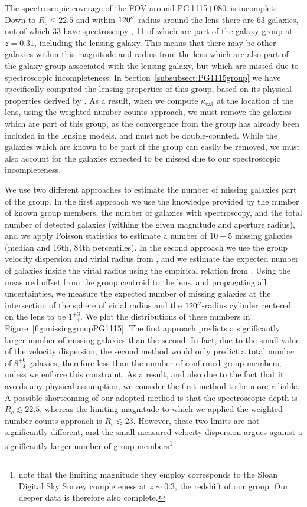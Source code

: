 \documentclass[useAMS,usenatbib]{mnras}
\newcommand\pg{PG\,1115$+$080}
\begin{document}
The spectroscopic coverage of the FOV around \pg~is incomplete. Down to $R_c\leq22.5$ and within $120\hbox{$^{\prime\prime}$}$-radius around the lens there are 63 galaxies, out of which 33 have spectroscopy \citep{WilsonEtal16}, 11 of which are part of the galaxy group at $z=0.31$, including the lensing galaxy. This means that there may be other galaxies within this magnitude and radius from the lens which are also part of the galaxy group associated with the lensing galaxy, but which are missed due to spectroscopic incompleteness. In Section~\ref{subsubsect:PG1115group} we have specifically computed the lensing properties of this group, based on its physical properties derived by \citet{WilsonEtal16}. As a result, when we compute $\kappa_\mathrm{ext}$ at the location of the lens, using the weighted number counts approach, we must remove the galaxies which are part of this group, as the convergence from the group has already been included in the lensing models, and must not be double-counted. While the galaxies which are known to be part of the group can easily be removed, we must also account for the galaxies expected to be missed due to our spectroscopic incompleteness. 

We use two different approaches to estimate the number of missing galaxies part of the group. In the first approach we use the knowledge provided by the number of known group members, the number of galaxies with spectroscopy, and the total number of detected galaxies (withing the given magnitude and aperture radius), and we apply Poisson statistics to estimate a number of $10\pm5$ missing galaxies (median and 16th, 84th percentiles). In the second approach we use the group velocity dispersion and virial radius from \citet{WilsonEtal16}, and we estimate the expected number of galaxies inside the virial radius using the empirical relation from \citet{AndreonEtal10}. Using the measured offset from the group centroid to the lens, and propagating all uncertainties, we measure the expected number of missing galaxies at the intersection of the sphere of virial radius and the $120\hbox{$^{\prime\prime}$}$-radius cylinder centered on the lens to be $1^{+3}_{-1}$. We plot the distributions of these numbers in Figure~\ref{fig:missinggroupPG1115}. The first approach predicts a significantly larger number of missing galaxies than the second. In fact, due to the small value of the velocity dispersion, the second method would only predict a total number of $8^{+6}_{-4}$ galaxies, therefore less than the number of confirmed group members, unless we enforce this constraint. As a result, and also due to the fact that it avoids any physical assumption, we consider the first method to be more reliable. A possible shortcoming of our adopted method is that the spectroscopic depth is $R_c\lesssim22.5$, whereas the limiting magnitude to which we applied the weighted number counts approach is $R_c\lesssim23$. However, these two limits are not significantly different, and the small measured velocity dispersion argues against a significantly larger number of group members\protect\footnote{\citet{AndreonEtal10} note that the limiting magnitude they employ corresponds to the Sloan Digital Sky Survey \citep{AdelmanEtal08} completeness at $z\sim0.3$, the redshift of our group. Our deeper data is therefore also complete.}.
\end{document}
